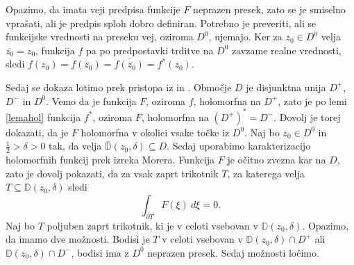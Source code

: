 \documentclass[mat1, tisk]{fmfdelo}
\begin{document}
    \begin{dokaz}
        Opazimo, da imata veji predpisa funkcije $F$ neprazen presek, zato se je smiselno vprašati, ali je predpis sploh dobro definiran. Potrebno je preveriti, ali se funkcijske vrednosti na preseku vej, oziroma $D^0$, ujemajo.  
        Ker za $z_0 \in D^0$ velja $\overline{z_0} = z_0$, funkcija $f$ pa po predpostavki trditve na $D^0$ zavzame realne vrednosti, sledi $f(z_0) = f(\overline{z_0}) = \overline{f(\overline{z_0})} = f^*(z_0)$.
        
        Sedaj se dokaza lotimo prek pristopa iz \cite[poglavje 6.7.1. izrek 84]{skripta_ana2} in \cite[stran 211 in 212]{conway}. 
        Območje $D$ je disjunktna unija $D^+$, $D^-$ in $D^0$. Vemo da je funkcija $F$, oziroma $f$, holomorfna na $D^+$, zato je po lemi \ref{lemahol} funkcija $f^*$, oziroma $F$, holomorfna na $(D^+)^* = D^-$. 
        Dovolj je torej dokazati, da je $F$ holomorfna v okolici vsake točke iz $D^0$. 
        Naj bo $z_0 \in D^0$ in $\frac{1}{2} > \delta > 0$ tak, da velja $\overline{\mathbb{D}}(z_0,\delta) \subseteq D$. Sedaj uporabimo karakterizacijo holomorfnih funkcij prek izreka Morera. 
        Funkcija $F$ je očitno zvezna kar na $D$, zato je dovolj pokazati, da za vsak zaprt trikotnik $T$, za katerega velja $T \subseteq \mathbb{D}(z_0, \delta)$ sledi
        $$ 
            \int_{\partial T}{F(\xi)~d\xi} = 0.
        $$
        Naj bo $T$ poljuben zaprt trikotnik, ki je v celoti vsebovan v $\mathbb{D}(z_0,\delta)$. Opazimo, da imamo dve možnosti.
        Bodisi je $T$ v celoti vsebovan v $\mathbb{D}(z_0,\delta) \cap D^+$ ali $\mathbb{D}(z_0,\delta) \cap D^-$, bodisi ima z $D^0$ neprazen presek. Sedaj možnosti ločimo.
        

\end{dokaz}
\end{document}
